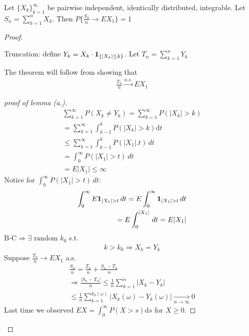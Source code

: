 \documentclass[11pt]{article}
\begin{document}
\begin{theorem}[SLLN]
    Let $\{ X_k \}_{k=1}^{\infty}$ be pairwise independent, identically distributed, integrable.
    Let $S_n = \sum_{k=1}^{n}X_k$. Then $P\{ \frac{S_n}{n} \longrightarrow EX_1 \} = 1$
\end{theorem}
\begin{proof}
    \,

    Truncation: define $Y_k = X_k \cdot \bm{1}_{\{ |X_k| \le k \}}$. Let $T_n = \sum_{k=1}^{n} Y_k$
    \begin{lemma}[(a)]
        The theorem will follow from showing that 
        \begin{align*}
            \frac{T_n}{n} \overset{a.s.}{\longrightarrow}EX_1
        \end{align*}
    \end{lemma}
    \begin{proof}[proof of lemma (a.)]
        \begin{align*}
            \sum_{k=1}^{\infty}P(X_k \neq Y_k) = \sum_{k=1}^{\infty}P(|X_k|>k)\\
            = \sum_{k=1}^{\infty} \int_{k-1}^{k} P(|X_k| > k) \mathrm{d}t \\
            \le \sum_{k=1}^{\infty} \int_{k-1}^{k}P(|X_1| . t)\, dt \\
            = \int_{0}^{\infty}P(|X_1| > t)\,dt \\
            = E|X_1| \le \infty
        \end{align*}
        Notice for $\int_{0}^{\infty}P(|X_1| > t)\,dt$:
        \begin{align*}
            \int_{0}^{\infty}E\bm{1}_{|X_1| > t}\,dt = E\int_{0}^{\infty}\bm{1}_{|X_1| > t}\,dt \\
            = E \int_{0}^{|X_1|}\,dt = E|X_1|
        \end{align*}
        $\text{B-C} \Longrightarrow \exists \text{ random }k_0$ s.t.
        \begin{align*}
            k > k_0 \Longrightarrow X_k = Y_k
        \end{align*}
        Suppose $\frac{T_n}{n} \longrightarrow EX_1$ a.s.
        \begin{align*}
            \frac{S_n}{n} = \frac{T_n}{n} + \frac{S_n - T_n}{n}\\
            \Longrightarrow \frac{|S_n - T_n|}{n} \le \frac{1}{n} \sum_{k=1}^{n}|X_k-Y_k|\\
            \le \frac{1}{n}\sum_{k=1}^{k_0(\omega)} |X_k(\omega)-Y_k(\omega)|
            \underset{n \longrightarrow \infty}{\longrightarrow} 0
        \end{align*}
        Last time we observed $EX = \int_{0}^{\infty}P(X > s)  \mathrm{d}s$ for $X \ge 0$.


\end{proof}
\end{proof}
\end{document}
